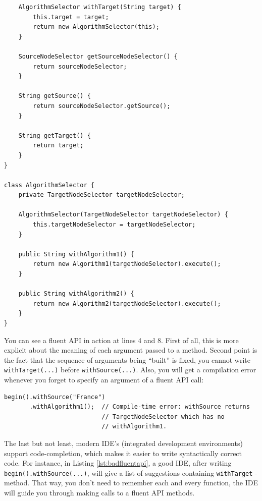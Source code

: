 \documentclass[oneside]{book}
\begin{document}
\begin{lstlisting}
    AlgorithmSelector withTarget(String target) {
        this.target = target;
        return new AlgorithmSelector(this);
    }
    
    SourceNodeSelector getSourceNodeSelector() {
        return sourceNodeSelector;
    }
    
    String getSource() {
        return sourceNodeSelector.getSource();
    }
    
    String getTarget() {
        return target;
    }
}

class AlgorithmSelector {
    private TargetNodeSelector targetNodeSelector;
    
    AlgorithmSelector(TargetNodeSelector targetNodeSelector) {
        this.targetNodeSelector = targetNodeSelector;
    } 
    
    public String withAlgorithm1() {
        return new Algorithm1(targetNodeSelector).execute();
    }
    
    public String withAlgorithm2() {
        return new Algorithm2(targetNodeSelector).execute();
    }
}
\end{lstlisting}
You can see a fluent API in action at lines 4 and 8. First of all, this is more explicit about the meaning of each argument passed to a method. Second point is the fact that the sequence of arguments being ``built'' is fixed, you cannot write \texttt{withTarget(...)} before \texttt{withSource(...)}. Also, you will get a compilation error whenever you forget to specify an argument of a fluent API call:
\newpage
\lstset{
numbers=none
}
\begin{lstlisting}[caption={Bad fluent API call},label=lst:badfluentapi]
begin().withSource("France")
       .withAlgorithm1();  // Compile-time error: withSource returns 
                           // TargetNodeSelector which has no 
                           // withAlgorithm1.
\end{lstlisting}
The last but not least, modern IDE's (integrated development environments) support code-completion, which makes it easier to write syntactically correct code. For instance, in Listing \ref{lst:badfluentapi}, a good IDE, after writing \\ \texttt{begin().withSource(...)}, will give a list of suggestions containing \texttt{withTarget} - method. That way, you don't need to remember each and every function, the IDE will guide you through making calls to a fluent API methods.
\end{document}
